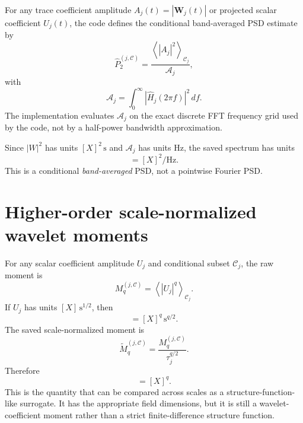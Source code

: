 \documentclass[11pt]{article}
\begin{document}
For any trace coefficient amplitude $A_j(t)=|\mathbf{W}_j(t)|$ or projected scalar coefficient $U_j(t)$, the code defines the conditional band-averaged PSD estimate by
\begin{equation}
 \widehat{P}_2^{(j,\mathcal C)} = \frac{\left\langle |A_j|^2 \right\rangle_{\mathcal C_j}}{\mathcal A_j},
\end{equation}
with
\begin{equation}
 \mathcal A_j = \int_0^{\infty} |\widehat{H}_j(2\pi f)|^2\,df.
\end{equation}
The implementation evaluates $\mathcal A_j$ on the exact discrete FFT frequency grid used by the code, not by a half-power bandwidth approximation.

Since $|W|^2$ has units $[X]^2\,\mathrm{s}$ and $\mathcal A_j$ has units Hz, the saved spectrum has units
\begin{equation}
 [\widehat{P}_2^{(j,\mathcal C)}] = [X]^2 / \mathrm{Hz}.
\end{equation}
This is a conditional \emph{band-averaged} PSD, not a pointwise Fourier PSD.

\section{Higher-order scale-normalized wavelet moments}

For any scalar coefficient amplitude $U_j$ and conditional subset $\mathcal C_j$, the raw moment is
\begin{equation}
 M_q^{(j,\mathcal C)} = \left\langle |U_j|^q \right\rangle_{\mathcal C_j}.
\end{equation}
If $U_j$ has units $[X]\,\mathrm{s}^{1/2}$, then
\begin{equation}
 [M_q^{(j,\mathcal C)}] = [X]^q \, \mathrm{s}^{q/2}.
\end{equation}
The saved scale-normalized moment is
\begin{equation}
 \widetilde{M}_q^{(j,\mathcal C)} = \frac{M_q^{(j,\mathcal C)}}{\tau_j^{q/2}}.
\end{equation}
Therefore
\begin{equation}
 [\widetilde{M}_q^{(j,\mathcal C)}] = [X]^q.
\end{equation}
This is the quantity that can be compared across scales as a structure-function-like surrogate. It has the appropriate field dimensions, but it is still a wavelet-coefficient moment rather than a strict finite-difference structure function.
\end{document}
